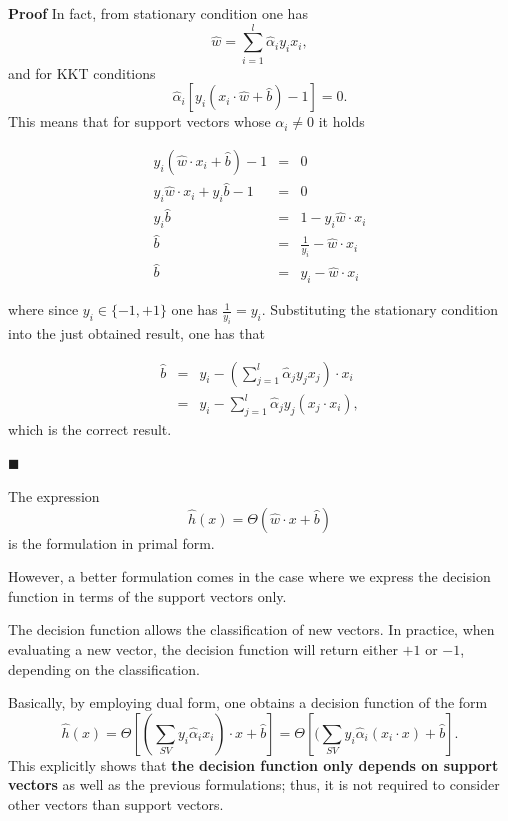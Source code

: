 \documentclass[10pt]{report}
\begin{document}
\textbf{Proof} In fact, from stationary condition one has
\[\hat{w} = \sum_{i=1}^l \hat{\alpha}_ i y_i x_i,\] and for KKT conditions \[\hat \alpha_i[y_i(x_i \cdot \hat{w} + \hat{b}) - 1] = 0.\] This means that for support vectors whose \(\alpha_i \neq 0\) it holds

$$\begin{array}{rcl} y_i(\hat w \cdot x_i + \hat b) - 1 & = & 0 \\ y_i\hat w \cdot x_i + y_i\hat b - 1 & = & 0 \\ y_i\hat b & = & 1 - y_i\hat w \cdot x_i \\ \hat b & = & \frac{1}{y_i} - \hat w \cdot x_i \\ \hat b & = & y_i - \hat w \cdot x_i \end{array}$$

where since \(y_i \in \{-1, +1\}\) one has \(\frac{1}{y_i} = y_i\). Substituting the stationary condition into the just obtained result, one has that

$$\begin{array}{rcl} \hat b & = & \displaystyle y_i - \left(\sum_{j=1}^{l}\hat\alpha_j y_j x_j\right) \cdot x_i \\ & = & \displaystyle y_i - \sum_{j=1}^l \hat \alpha_j y_j (x_j \cdot x_i),\end{array}$$ which is the correct result.

\begin{flushright}
$\blacksquare$
\end{flushright}

The expression
\[\hat{h}(x) = \Theta(\hat{w} \cdot x + \hat{b})\] is the formulation in
primal form.

However, a better formulation comes in the case where we express the
decision function in terms of the support vectors only.

The decision function allows the classification of new vectors. In practice,
when evaluating a new vector, the decision function will return either \(+1\) or
\(-1\), depending on the classification.

Basically, by employing dual form, one obtains a decision function of the form
\[\hat{h}(x) = \Theta[(\sum_{SV} y_i \hat{\alpha}_ i x_i) \cdot x + \hat{b}] =\Theta[(\sum_{SV} y_i \hat{\alpha}_ i( x_i \cdot x) + \hat{b}].\]
This explicitly shows that \textbf{the decision function only depends on
support vectors} as well as the previous formulations; thus, it is not required
to consider other vectors than support vectors.
\end{document}
